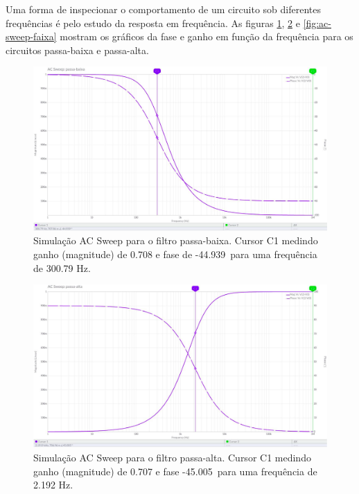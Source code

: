 \documentclass{article}
\begin{document}
Uma forma de inspecionar o comportamento de um circuito sob diferentes frequências é pelo estudo da resposta em frequência. As figuras \ref{fig:ac-sweep-baixa}, \ref{fig:ac-sweep-alta} e \ref{fig:ac-sweep-faixa} mostram os gráficos da fase e ganho em função da frequência para os circuitos passa-baixa e passa-alta.

\begin{figure}[ht!]
  \centering
  \includegraphics[width=\textwidth]{fig/ac-sweep-baixa.png}
  \caption{Simulação AC Sweep para o filtro passa-baixa. Cursor C1 medindo ganho (magnitude) de 0.708 e fase de -44.939\textdegree\ para uma frequência de 300.79 Hz.}
  \label{fig:ac-sweep-baixa}
\end{figure}

\begin{figure}[ht!]
  \centering
  \includegraphics[width=\textwidth]{fig/ac-sweep-alta.png}
  \caption{Simulação AC Sweep para o filtro passa-alta. Cursor C1 medindo ganho (magnitude) de 0.707 e fase -45.005\textdegree\ para uma frequência de 2.192 Hz.}
  \label{fig:ac-sweep-alta}
\end{figure}
\end{document}
